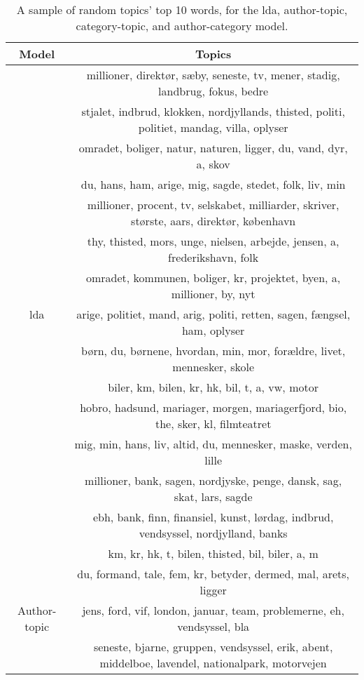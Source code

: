 \begin{table}
	\caption{A sample of random topics' top 10 words, for the \gls{lda}, author-topic, category-topic, and author-category model. }
	\label{tab:all_gibbs_topic_examples}
	\centering
	\begin{tabular}{c|c}
		Model & Topics \\
		\midrule
		\multirow{15}{*}{\gls{lda}} & millioner, direktør, sæby, seneste, tv, mener, stadig, landbrug, fokus, bedre \\
		& stjalet, indbrud, klokken, nordjyllands, thisted, politi, politiet, mandag, villa, oplyser \\
		& omradet, boliger, natur, naturen, ligger, du, vand, dyr, a, skov \\
		& du, hans, ham, arige, mig, sagde, stedet, folk, liv, min \\
		& millioner, procent, tv, selskabet, milliarder, skriver, største, aars, direktør, københavn \\
		& thy, thisted, mors, unge, nielsen, arbejde, jensen, a, frederikshavn, folk \\
		& omradet, kommunen, boliger, kr, projektet, byen, a, millioner, by, nyt \\
		& arige, politiet, mand, arig, politi, retten, sagen, fængsel, ham, oplyser \\
		& børn, du, børnene, hvordan, min, mor, forældre, livet, mennesker, skole \\
		& biler, km, bilen, kr, hk, bil, t, a, vw, motor \\
		& hobro, hadsund, mariager, morgen, mariagerfjord, bio, the, sker, kl, filmteatret \\
		& mig, min, hans, liv, altid, du, mennesker, maske, verden, lille \\
		& millioner, bank, sagen, nordjyske, penge, dansk, sag, skat, lars, sagde \\
		& ebh, bank, finn, finansiel, kunst, lørdag, indbrud, vendsyssel, nordjylland, banks \\
		& km, kr, hk, t, bilen, thisted, bil, biler, a, m \\
		\midrule
		\multirow{15}{*}{Author-topic} & du, formand, tale, fem, kr, betyder, dermed, mal, arets, ligger \\
		& jens, ford, vif, london, januar, team, problemerne, eh, vendsyssel, bla \\
		& seneste, bjarne, gruppen, vendsyssel, erik, abent, middelboe, lavendel, nationalpark, motorvejen \\

\end{tabular}
\end{table}
